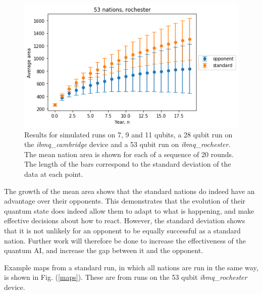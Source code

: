 \documentclass[conference]{IEEEtran}
\begin{document}
\begin{figure}[htbp]
\begin{center}
\includegraphics[width=0.95\columnwidth]{figures/results_rochester.png}
\caption{Results for simulated runs on 7, 9 and 11 qubits, a 28 qubit run on the \textit{ibmq\_cambridge} device and a 53 qubit run on \textit{ibmq\_rochester}. The mean nation area is shown for each of a sequence of 20 rounds. The length of the bars correspond to the standard deviation of the data at each point.}
\label{default}
\end{center}
\end{figure}

The growth of the mean area shows that the standard nations do indeed have an advantage over their opponents. This demonstrates that the evolution of their quantum state does indeed allow them to adapt to what is happening, and make effective decisions about how to react. However, the standard deviation shows that it is not unlikely for an opponent to be equally successful as a standard nation. Further work will therefore be done to increase the effectiveness of the quantum AI, and increase the gap between it and the opponent.

Example maps from a standard run, in which all nations are run in the same way, is shown in Fig. (\ref{maps}). These are from runs on the 53 qubit \textit{ibmq\_rochester} device.
\end{document}
